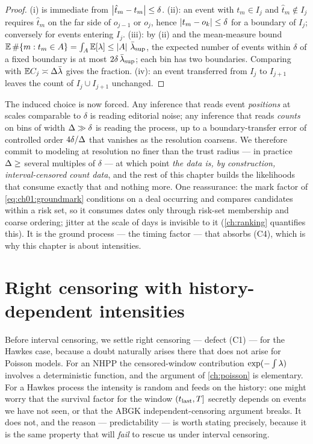 \begin{proof}
(i) is immediate from $\left|\hat t_m - t_m\right|\le\delta$. (ii): an event with
$t_m \in I_j$ and $\hat t_m \notin I_j$ requires $\hat t_m$ on the far side
of $o_{j-1}$ or $o_j$, hence $\left|t_m - o_k\right|\le\delta$ for a boundary of
$I_j$; conversely for events entering $I_j$. (iii): by (ii) and the mean-measure
bound $\mathbb{E}\,\#\{m: t_m \in A\} = \int_A \mathbb{E}[\lambda] \le
\left|A\right|\,\bar{\lambda}_{\sup}$, the expected number of events within $\delta$ of
a fixed boundary is at most $2\delta\,\bar{\lambda}_{\sup}$; each bin has two
boundaries. Comparing with $\mathbb{E} C_j \asymp \Delta\bar{\lambda}$ gives
the fraction. (iv): an event transferred from $I_j$ to $I_{j+1}$ leaves the
count of $I_j \cup I_{j+1}$ unchanged.
\end{proof}

The induced choice is now forced. Any inference that reads event
\emph{positions} at scales comparable to $\delta$ is reading editorial
noise; any inference that reads \emph{counts} on bins of width
$\Delta \gg \delta$ is reading the process, up to a boundary-transfer
error of controlled order $4\delta/\Delta$ that vanishes as the resolution
coarsens. We therefore commit to modeling at resolution no finer than the
trust radius --- in practice $\Delta \ge$ several multiples of $\delta$ ---
at which point \emph{the data is, by construction, interval-censored count
data}, and the rest of this chapter builds the likelihoods that consume
exactly that and nothing more. One reassurance: the
mark factor of \cref{eq:ch01:groundmark} conditions on a deal occurring and
compares candidates within a risk set, so it consumes dates only through
risk-set membership and coarse ordering; jitter at the scale of days is
invisible to it (\cref{ch:ranking} quantifies this). It is the ground
process --- the timing factor --- that absorbs (C4), which is why this
chapter is about intensities.

\section{Right censoring with history-dependent intensities}\label{ch06:sec:rightcens}

Before interval censoring, we settle right censoring --- defect (C1) --- for
the Hawkes case, because a doubt naturally arises there that does not arise
for Poisson models. For an NHPP the censored-window contribution
$\exp(-\int\lambda)$ involves a deterministic function, and the argument of
\cref{ch:poisson} is elementary. For a Hawkes process the intensity is
random and feeds on the history: one might worry that the survival factor
for the window $(t_{\text{last}}, T]$ secretly depends on events we have
not seen, or that the ABGK independent-censoring argument breaks. It does
not, and the reason --- predictability --- is worth stating precisely,
because it is the same property that will \emph{fail} to rescue us under
interval censoring.

